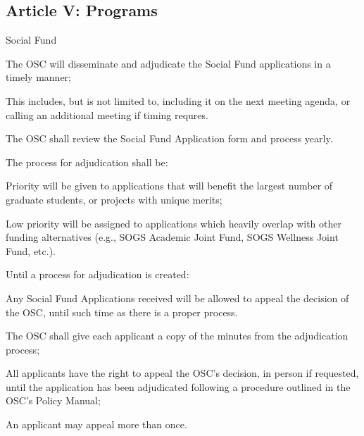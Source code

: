 \subsection{Article V: Programs}
\begin{longenum}[ label*=\thesubsection.\arabic*., align=left] 
\item Social Fund
		\begin{longenum}[label*=\arabic*., align=left]
		\item The OSC will disseminate and adjudicate the Social Fund applications in a timely manner;
			\begin{longenum}[label*=\arabic*., align=left]
			\item This includes, but is not limited to, including it on the next meeting agenda, or calling an additional meeting if timing requres.
			\end{longenum}
		\item The OSC shall review the Social Fund Application form and process yearly.
		\item The process for adjudication shall be:
			\begin{longenum}[label*=\arabic*., align=left]
			\item Priority will be given to applications that will benefit the largest number of graduate students, or projects with unique merits;
			\item Low priority will be assigned to applications which heavily overlap with other funding alternatives (e.g., SOGS Academic Joint Fund, SOGS Wellness Joint Fund, etc.).
			\item Until a process for adjudication is created:
				\begin{longenum}[label*=\arabic*., align=left]
				\item Any Social Fund Applications received will be allowed to appeal the decision of the OSC, until such time as there is a proper process.
					\begin{longenum}[label*=\arabic*., align=left]
					\item The OSC shall give each applicant a copy of the minutes from the adjudication process;
					\item All applicants have the right to appeal the OSC's decision, in person if requested, until the application has been adjudicated following a procedure outlined in the OSC's Policy Manual;
						\begin{longenum}[label*=\arabic*., align=left]
						\item An applicant may appeal more than once.

\end{longenum}
\end{longenum}
\end{longenum}
\end{longenum}
\end{longenum}
\end{longenum}

